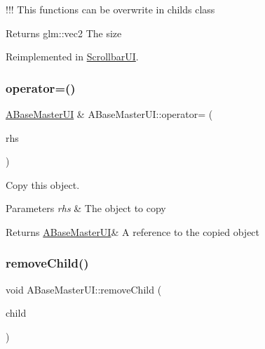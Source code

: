 !!! This functions can be overwrite in childs class

\begin{DoxyReturn}{Returns}
glm\+::vec2 The size 
\end{DoxyReturn}


Reimplemented in \hyperlink{class_scrollbar_u_i_ad9f2de5f7fbb4acdfe25fc2dbe3eb943}{Scrollbar\+UI}.

\mbox{\label{class_a_base_master_u_i_a2023324b8f6cd85877c7932d5c46276f}} 
\subsubsection{\texorpdfstring{operator=()}{operator=()}}
{\footnotesize\ttfamily \hyperlink{class_a_base_master_u_i}{A\+Base\+Master\+UI} \& A\+Base\+Master\+U\+I\+::operator= (\begin{DoxyParamCaption}\item[{\hyperlink{class_a_base_master_u_i}{A\+Base\+Master\+UI} const \&}]{rhs }\end{DoxyParamCaption})}



Copy this object. 


\begin{DoxyParams}{Parameters}
{\em rhs} & The object to copy \\
\hline
\end{DoxyParams}
\begin{DoxyReturn}{Returns}
\hyperlink{class_a_base_master_u_i}{A\+Base\+Master\+UI}\& A reference to the copied object 
\end{DoxyReturn}
\mbox{\label{class_a_base_master_u_i_a0965153a5bf1d5a7de71f65c2f8fcc0a}} 
\subsubsection{\texorpdfstring{remove\+Child()}{removeChild()}}
{\footnotesize\ttfamily void A\+Base\+Master\+U\+I\+::remove\+Child (\begin{DoxyParamCaption}\item[{\hyperlink{class_a_base_u_i}{A\+Base\+UI} $\ast$}]{child }\end{DoxyParamCaption})}



